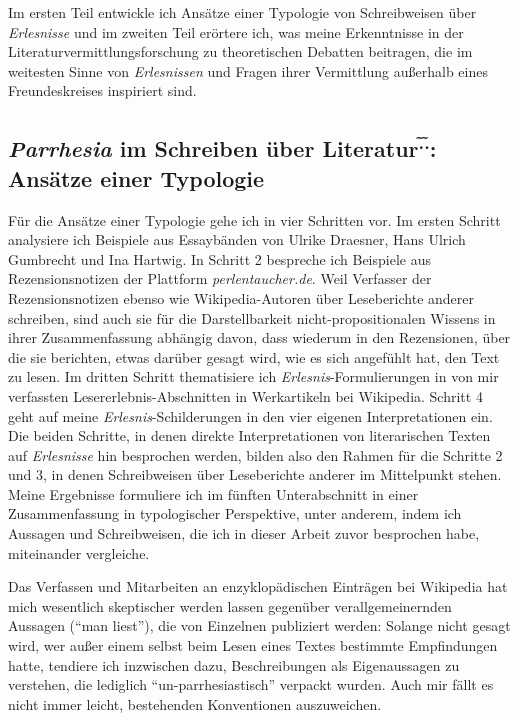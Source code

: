 \documentclass[fontsize=12pt]{scrartcl}
\begin{document}
Im ersten Teil entwickle ich Ans\"atze einer Typologie von Schreibweisen \"uber \textit{Erlesnisse} und im zwei\-ten Teil er\"ortere ich, was meine Erkenntnisse in der Li\-te\-ra\-tur\-ver\-mitt\-lungsfor\-schung zu theo\-retischen Debatten beitragen, die im weitesten Sinne von \textit{Erlesnissen} und Fragen ihrer Ver\-mitt\-lung au{\ss}erhalb eines Freund\textsuperscript{\tiny *}eskreises inspiriert sind. 

\pagebreak
\subsection{\textit{Parrhesia} im Schreiben \"uber Literatur\textsuperscript{\~.\~.}: Ans\"atze einer Typologie}
\label{subsec:7.1}

F\"ur die Ans\"atze einer Typologie gehe ich in \mbox{vier} Schritten vor. Im ersten Schritt ana\-lysiere ich Beispiele aus Essayb\"anden von Ulrike Draesner, Hans Ulrich Gumbrecht und Ina Hartwig. In Schritt 2 bespreche ich Beispiele aus Rezensionsnotizen der Plattform \textit{per\-len\-tau\-cher.de}. Weil Verfasser\textsuperscript{\tiny *} der Rezensionsnotizen ebenso wie Wi\-ki\-pe\-dia-Autoren\textsuperscript{\tiny *} \"uber Leseberichte an\-de\-rer schrei\-ben, sind auch sie f\"ur die Darstellbarkeit nicht-pro\-po\-si\-ti\-o\-na\-len Wissens in ihrer Zusammenfassung abh\"angig davon, dass wiederum in den Rezensionen, \"uber die sie berichten, etwas dar\"uber gesagt wird, wie es sich angef\"uhlt hat, den Text zu lesen. Im dritten Schritt thematisiere ich \textit{Erlesnis}-Formulierungen in von mir verfassten Lesererlebnis-Abschnitten in Werkartikeln bei Wi\-ki\-pe\-dia. Schritt 4 geht auf meine \textit{Erlesnis}-Schilderungen in den \mbox{vier} eigenen Interpretationen ein. Die beiden Schritte, in denen direkte Interpretationen von li\-te\-ra\-rischen Texten auf \textit{Erlesnisse} hin besprochen werden, bilden also den Rahmen f\"ur die Schritte 2 und 3, in denen Schreibweisen \"uber Leseberichte an\-de\-rer im Mittelpunkt stehen. Meine Ergebnisse formuliere ich im f\"unften Unterabschnitt in einer Zusammenfassung in typologischer Perspektive, unter anderem, indem ich Aussagen und Schreibweisen, die ich in dieser Arbeit zuvor besprochen habe, miteinander vergleiche.

Das Verfassen und Mitarbei\-ten an enzy\-klop\"adischen Eintr\"agen bei Wi\-ki\-pe\-dia hat mich we\-sent\-lich skeptischer werden lassen gegen\"uber verallgemeinernden Aussagen ("`man liest"'), die von Einzelnen pu\-bli\-ziert werden: Solange nicht gesagt wird, wer au{\ss}er einem \mbox{selbst} beim Lesen eines Textes bestimmte Emp\-fin\-dun\-gen hatte, tendiere ich inzwischen dazu, Beschreibungen als Eigenaussagen zu verstehen, die lediglich "`un-parrhesiastisch"' verpackt wurden. Auch mir f\"allt es nicht immer leicht, bestehenden Konventionen auszuweichen.
\end{document}
